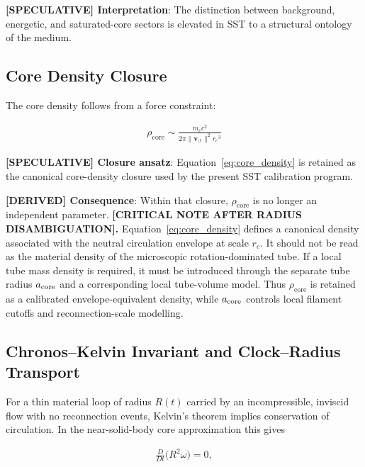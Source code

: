 \documentclass[11pt]{article}
\theoremstyle{definition}
\theoremstyle{plain}
\theoremstyle{remark}
\newcommand{\rhocore}{\rho_{\mathrm{core}}}
\newcommand{\rc}{{r_c}}
\newcommand{\vnorm}{\lVert \mathbf{v}_{\!\boldsymbol{\circlearrowleft}} \rVert}
\begin{document}
        \textbf{[SPECULATIVE] Interpretation}: The distinction between background, energetic, and saturated-core sectors is elevated in SST to a structural ontology of the medium.
    
    \subsection{Core Density Closure}
        
        The core density follows from a force constraint:
        
        \begin{align}
            \rhocore \sim \frac{m_e c^2}{2\pi \vnorm^2 \rc^3}
            \label{eq:core_density}
        \end{align}
        
        \textbf{[SPECULATIVE] Closure ansatz}: Equation~\eqref{eq:core_density} is retained as the canonical core-density closure used by the present SST calibration program.

        \textbf{[DERIVED] Consequence}: Within that closure, $\rhocore$ is no longer an independent parameter.
        \textbf{[CRITICAL NOTE AFTER RADIUS DISAMBIGUATION].}
        Equation~\eqref{eq:core_density} defines a canonical density associated
        with the neutral circulation envelope at scale \(\rc\). It should not be
        read as the material density of the microscopic rotation-dominated tube.
        If a local tube mass density is required, it must be introduced through
        the separate tube radius \(a_{\rm core}\) and a corresponding local
        tube-volume model. Thus \(\rhocore\) is retained as a calibrated
        envelope-equivalent density, while \(a_{\rm core}\) controls local
        filament cutoffs and reconnection-scale modelling.


    \subsection{Chronos--Kelvin Invariant and Clock--Radius Transport}
        \label{subsec:chronos_kelvin}

        For a thin material loop of radius $R(t)$ carried by an incompressible, inviscid flow with no reconnection events, Kelvin's theorem implies conservation of circulation. In the near-solid-body core approximation this gives

        \begin{align}
            \frac{D}{Dt}\!\bigl(R^2 \omega\bigr) = 0,
            \label{eq:chronos_kelvin_basic}
        \end{align}
\end{document}
